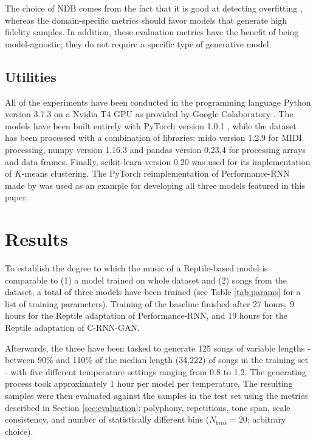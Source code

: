 \documentclass[a4paper]{book}
\begin{document}
The choice of NDB comes from the fact that it is good at detecting overfitting \parencite{borji_pros_2018}, whereas the domain-specific metrics should favor models that generate high fidelity samples. In addition, these evaluation metrics have the benefit of being model-agnostic; they do not require a specific type of generative model.

\section{Utilities}

All of the experiments have been conducted in the programming language Python version 3.7.3 \parencite{rossum_python_2019} on a Nvidia T4 GPU as provided by Google Colaboratory \parencite{google_colaboratory_2019}. The models have been built entirely with PyTorch version 1.0.1 \parencite{paszke_automatic_2017}, while the dataset has been processed with a combination of libraries: mido version 1.2.9 \parencite{bjorndalen_mido_2018} for MIDI processing, numpy version 1.16.3 \parencite{walt_numpy_2011} and pandas version 0.23.4 \parencite{mckinney_data_2010} for processing arrays and data frames. Finally, scikit-learn version 0.20 \parencite{pedregosa_scikit-learn_2011} was used for its implementation of $K$-means clustering. The PyTorch reimplementation of Performance-RNN made by \textcite{lee_event-based_2019} was used as an example for developing all three models featured in this paper.

\chapter{Results}\label{chap:results}

To establish the degree to which the music of a Reptile-based model is comparable to (1) a model trained on whole dataset and (2) songs from the dataset, a total of three models have been trained (see Table \ref{tab:params} for a list of training parameters). Training of the baseline finished after 27 hours, 9 hours for the Reptile adaptation of Performance-RNN, and 19 hours for the Reptile adaptation of C-RNN-GAN.

Afterwards, the three have been tasked to generate 125 songs of variable lengths - between 90\% and 110\% of the median length (34,222) of songs in the training set - with five different temperature settings ranging from 0.8 to 1.2. The generating process took approximately 1 hour per model per temperature. The resulting samples were then evaluated against the samples in the test set using the metrics described in Section \ref{sec:evaluation}: polyphony, repetitions, tone span, scale consistency, and number of statistically different bins ($N_{bins} = 20$; arbitrary choice).
\end{document}
